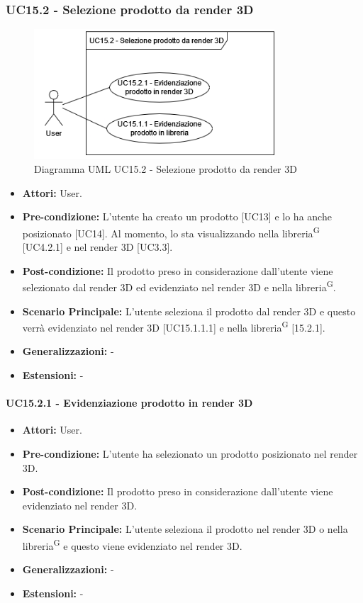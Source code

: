 \subsubsection{UC15.2 - Selezione prodotto da render 3D}
\begin{figure}[H]
  \centering
  \includegraphics[width=0.8\textwidth]{UC_diagrams_11-20/UC15.2.drawio.png}
   \caption{Diagramma UML UC15.2 - Selezione prodotto da render 3D}
\end{figure}
\begin{itemize}
    \item \textbf{Attori:} User.
    \item \textbf{Pre-condizione:} L'utente ha creato un prodotto [UC13] e lo ha anche posizionato [UC14]. Al momento, lo sta visualizzando nella libreria\textsuperscript{G} [UC4.2.1] e nel render 3D [UC3.3].
    \item \textbf{Post-condizione:} Il prodotto preso in considerazione dall'utente viene selezionato dal render 3D ed evidenziato nel render 3D e nella libreria\textsuperscript{G}.
    \item \textbf{Scenario Principale:} L'utente seleziona il prodotto dal render 3D e questo verrà evidenziato nel render 3D [UC15.1.1.1] e nella libreria\textsuperscript{G} [15.2.1].
    \item \textbf{Generalizzazioni:} -
    \item \textbf{Estensioni:} -
\end{itemize}


\paragraph{UC15.2.1 - Evidenziazione prodotto in render 3D}
\begin{itemize}
    \item \textbf{Attori:} User.
    \item \textbf{Pre-condizione:} L'utente ha selezionato un prodotto posizionato nel render 3D.
    \item \textbf{Post-condizione:} Il prodotto preso in considerazione dall'utente viene evidenziato nel render 3D.
    \item \textbf{Scenario Principale:} L'utente seleziona il prodotto nel render 3D o nella libreria\textsuperscript{G} e questo viene evidenziato nel render 3D.
    \item \textbf{Generalizzazioni:} -
    \item \textbf{Estensioni:} -
\end{itemize}


